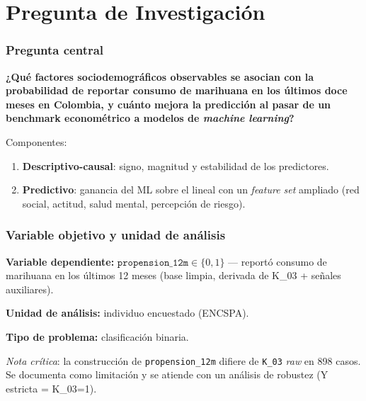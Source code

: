 \section{Pregunta de Investigación}

\begin{frame}
\frametitle{Pregunta central}
\begin{center}
\large
\textbf{¿Qué factores sociodemográficos observables se asocian con la probabilidad de reportar consumo de marihuana en los últimos doce meses en Colombia, y cuánto mejora la predicción al pasar de un benchmark econométrico a modelos de \textit{machine learning}?}
\end{center}
\vspace{0.4cm}
\normalsize
Componentes:
\begin{enumerate}
    \item \textbf{Descriptivo-causal}: signo, magnitud y estabilidad de los predictores.
    \item \textbf{Predictivo}: ganancia del ML sobre el lineal con un \textit{feature set} ampliado (red social, actitud, salud mental, percepción de riesgo).
\end{enumerate}
\end{frame}

\begin{frame}
\frametitle{Variable objetivo y unidad de análisis}
\textbf{Variable dependiente:} \(\texttt{propension\_12m}\in\{0,1\}\) — reportó consumo de marihuana en los últimos 12 meses (base limpia, derivada de K\_03 + señales auxiliares).

\vspace{0.3cm}
\textbf{Unidad de análisis:} individuo encuestado (ENCSPA).

\vspace{0.3cm}
\textbf{Tipo de problema:} clasificación binaria.

\vspace{0.4cm}
\textit{Nota crítica}: la construcción de \texttt{propension\_12m} difiere de \texttt{K\_03} \textit{raw} en 898 casos. Se documenta como limitación y se atiende con un análisis de robustez (Y estricta = K\_03=1).
\end{frame}

